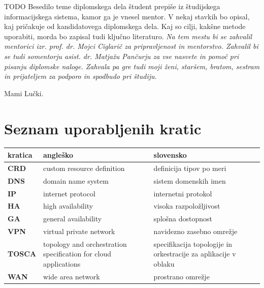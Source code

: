 \documentclass[a4paper, 12pt]{book}
\newcommand{\clearemptydoublepage}{\newpage{\pagestyle{empty}\cleardoublepage}}
\begin{document}
TODO
Besedilo teme diplomskega dela študent prepiše iz študijskega informacijskega sistema, kamor ga je vnesel mentor. V nekaj stavkih bo opisal, kaj pričakuje od kandidatovega diplomskega dela. Kaj so cilji, kakšne metode uporabiti, morda bo zapisal tudi ključno literaturo.
\vspace{15mm}
\vspace{2cm}
\clearemptydoublepage
\thispagestyle{empty}\mbox{}\vfill\null\it%
\noindent
Na tem mestu bi se zahvalil mentorici izr. prof. dr. Mojci Ciglarič za pripravljenost in mentorstvo.
Zahvalil bi se tudi somentorju asist. dr. Matjažu Pančurju za vse nasvete in pomoč pri pisanju diplomske naloge.
Zahvala pa gre tudi moji ženi, staršem, bratom, sestram in prijateljem za podporo in spodbudo pri študiju.
\rm\normalfont
\clearemptydoublepage
\thispagestyle{empty}\mbox{}{\textheight}\mbox{}\hfill\begin{minipage}{0.55\textwidth}%
Mami Lučki.
\normalfont\end{minipage}
\clearemptydoublepage
\pagestyle{empty}
\def\thepage{}%
\tableofcontents{}
\clearemptydoublepage
\chapter*{Seznam uporabljenih kratic}  %
\noindent\begin{tabular}{p{}|p{}|p{}}    %
  {\bf kratica} & {\bf angleško}                             & {\bf slovensko} \\ \hline
  {\bf CRD} & custom resource definition & definicija tipov po meri \\
  {\bf DNS} & domain name system & sistem domenskih imen \\
  {\bf IP} & internet protocol & internetni protokol \\
  {\bf HA} & high availability & visoka razpoložljivost \\
  {\bf GA} & general availability & splošna dostopnost \\
  {\bf VPN} & virtual private network & navidezno zasebno omrežje \\
  {\bf TOSCA} & topology and orchestration specification for cloud applications & specifikacija topologije in orkestracije za aplikacije v oblaku \\
  {\bf WAN} & wide area network & prostrano omrežje \\
\end{tabular}
\clearemptydoublepage
\end{document}
